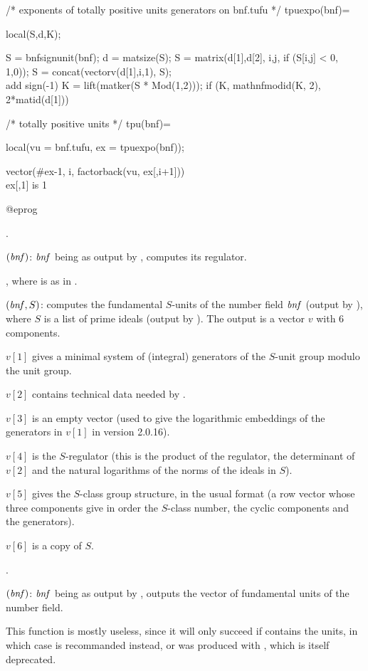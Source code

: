 \bprog
/* exponents of totally positive units generators on bnf.tufu */
tpuexpo(bnf)=
{ local(S,d,K);

  S = bnfsignunit(bnf); d = matsize(S);
  S = matrix(d[1],d[2], i,j, if (S[i,j] < 0, 1,0));
  S = concat(vectorv(d[1],i,1), S);   \\ add sign(-1)
  K = lift(matker(S * Mod(1,2)));
  if (K, mathnfmodid(K, 2), 2*matid(d[1]))
}

/* totally positive units */
tpu(bnf)=
{ local(vu = bnf.tufu, ex = tpuexpo(bnf));

  vector(#ex-1, i, factorback(vu, ex[,i+1]))  \\ ex[,1] is 1
}
@eprog

.

$(\hbox{\it bnf\/})$: $\hbox{\it bnf\/}$ being as output by
, computes its regulator.

, where  is as in
.

$(\hbox{\it bnf\/},S)$: computes the fundamental $S$-units of the
number field $\hbox{\it bnf\/}$ (output by ), where $S$ is a list of
prime ideals (output by ). The output is a vector $v$ with
6 components.

$v[1]$ gives a minimal system of (integral) generators of the $S$-unit group
modulo the unit group.

$v[2]$ contains technical data needed by .

$v[3]$ is an empty vector (used to give the logarithmic embeddings of the
generators in $v[1]$ in version 2.0.16).

$v[4]$ is the $S$-regulator (this is the product of the regulator, the
determinant of $v[2]$ and the natural logarithms of the norms of the ideals
in $S$).

$v[5]$ gives the $S$-class group structure, in the usual format
(a row vector whose three components give in order the $S$-class number,
the cyclic components and the generators).

$v[6]$ is a copy of $S$.

.

$(\hbox{\it bnf\/})$: $\hbox{\it bnf\/}$ being as output by
, outputs the vector of fundamental units of the number field.

This function is mostly useless, since it will only succeed if
 contains the units, in which case  is recommanded
instead, or  was produced with , which is itself
deprecated.

